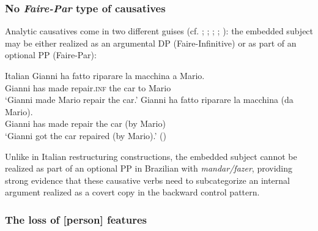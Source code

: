 \documentclass[output=paper]{langsci/langscibook}
\begin{document}
\subsubsection{No \textit{Faire-Par} type of causatives} %

Analytic causatives come in two different guises (cf. \citealt{Kayne1975}; \citealt{Huber1980}; \citealt{Burzio1986}; \citealt{Enzinger2010}; \citealt{Campanini2012}): the embedded subject may be either realized as an argumental DP  (Faire-Infinitive) or as part of an optional  PP (Faire-Par):

\ea%
         Italian\label{ex:moreno:18}
    \ea  
    \gll Gianni ha  fatto   riparare    la   macchina a Mario.\\
         Gianni has made repair.\textsc{inf} the car    to Mario \\
    \glt ‘Gianni made Mario repair the car.’
    \ex  
    \gll Gianni ha fatto    riparare   la  macchina   (da Mario). \\
         Gianni has made repair   the car  (by Mario) \\
    \glt ‘Gianni got the car repaired (by Mario).’ (\citealt{Campanini2012})
    \z
\z

Unlike in Italian restructuring constructions, the embedded subject cannot be realized as part of an optional  PP in Brazilian  with \textit{mandar\slash fazer}, providing strong evidence that these causative verbs need to subcategorize an internal argument realized as a covert copy in the backward control pattern. 

    \z



\subsubsection{The loss of [person] features}%
\end{document}
